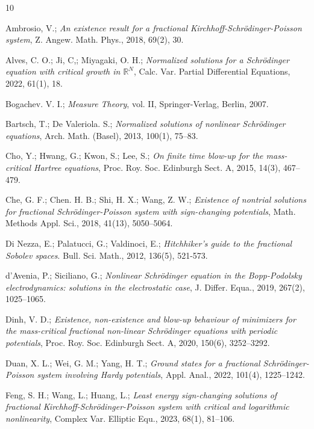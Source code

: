 \documentclass[11pt]{article}
\numberwithin{equation}{section}
\begin{document}
\begin{thebibliography}{10}

  Ambrosio,  V.;
\emph{An existence result for a fractional Kirchhoff-Schr\"odinger-Poisson system},
 Z. Angew. Math. Phys., 2018, 69(2),  30.

 Alves, C. O.; Ji, C,; Miyagaki, O. H.;
\emph{Normalized solutions for a Schr\"odinger  equation with critical growth in 
$\mathbb{R}^N$}, Calc. Var. Partial Differential Equations, 2022,   61(1), 18.

   Bogachev. V. I.;
\emph{Measure Theory}, vol. II, Springer-Verlag, Berlin, 2007.

 Bartsch, T.; De Valeriola. S.;
\emph{Normalized solutions of nonlinear Schr\"odinger equations},
 Arch. Math. (Basel), 2013,  100(1), 75--83.

   Cho, Y.;  Hwang,  G.;  Kwon, S.;  Lee, S.;
\emph{On finite time blow-up for the mass-critical Hartree equations},
Proc. Roy. Soc. Edinburgh Sect. A,  2015,  14(3), 467--479.

 Che, G. F.; Chen. H. B.; Shi, H. X.; Wang, Z. W.;
\emph{Existence of nontrial solutions for fractional Schr\"odinger-Poisson 
system with sign-changing  potentials}, 
Math. Methods Appl. Sci., 2018, 41(13), 5050--5064.

  Di Nezza, E.; Palatucci, G.; Valdinoci, E.;
\emph{Hitchhiker's guide to the fractional Sobolev spaces}. 
Bull. Sci. Math., 2012, 136(5), 521-573.

 d'Avenia, P.;  Siciliano, G.;
\emph{Nonlinear Schr\"odinger equation in the Bopp-Podolsky electrodynamics: 
solutions in the electrostatic case}, J. Differ. Equa.,  2019,  267(2), 1025--1065.

 Dinh, V. D.;
\emph{Existence, non-existence and blow-up behaviour of minimizers for the 
mass-critical fractional non-linear Schr\"odinger equations with periodic potentials},
Proc. Roy. Soc. Edinburgh Sect. A,  2020,  150(6), 3252--3292.

  Duan, X. L.; Wei, G. M.; Yang, H. T.;
\emph{Ground states for a fractional Schr\"odinger-Poisson system involving 
Hardy potentials}, Appl. Anal., 2022, 101(4), 1225--1242.

  Feng, S. H.; Wang, L.; Huang, L.;
\emph{Least energy sign-changing solutions of fractional Kirchhoff-Schr\"odinger-Poisson 
system with critical and logarithmic nonlinearity}, 
Complex Var. Elliptic Equ., 2023,  68(1), 81--106.


\end{thebibliography}
\end{document}
